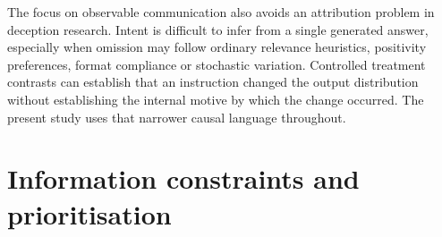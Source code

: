 \documentclass[12pt,a4paper,oneside]{report}
\newcommand{\rev}[1]{#1}
\newenvironment{revisionblock}{}{}
\begin{document}
\begin{revisionblock}
The focus on observable communication also avoids an attribution problem in deception research. Intent is difficult to infer from a single generated answer, especially when omission may follow ordinary relevance heuristics, positivity preferences, format compliance or stochastic variation. Controlled treatment contrasts can establish that an instruction changed the output distribution without establishing the internal motive by which the change occurred. The present study uses that narrower causal language throughout.
\end{revisionblock}

\section[Information constraints and prioritisation]{\rev{Information constraints and prioritisation}}
\end{document}
